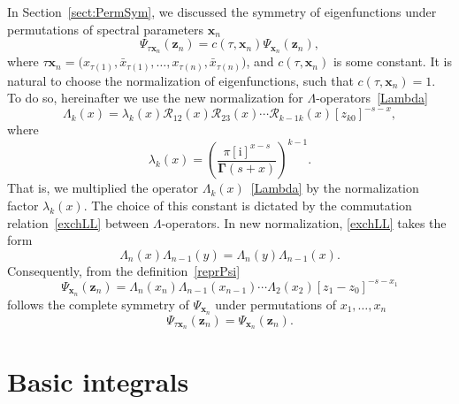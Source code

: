 \documentclass[pdftex]{sigma}
\renewcommand{\imath}{\mathrm{i}}
\numberwithin{equation}{section}
\begin{document}
In Section~\ref{sect:PermSym}, we discussed the symmetry of eigenfunctions under permutations of spectral parameters $\bm x_n$
\begin{equation*}
	\Psi_{\tau \bm x_n}(\bm z_n) =
	c(\tau,\bm x_n) \Psi_{\bm x_n}(\bm z_n) ,
\end{equation*}
where $\tau \bm x_n = \bigl(x_{\tau(1)},\bar{x}_{\tau(1)}, \dots , x_{\tau(n)},\bar{x}_{\tau(n)}\bigr)$, and $c(\tau,\bm x_n)$ is some constant. It is natural to choose the normalization of eigenfunctions, such that $c(\tau,\bm x_n)=1$.
To do so, hereinafter we use the new normalization for $\Lambda$-operators~\eqref{Lambda}
\begin{equation*}
	\Lambda_k(x) = \lambda_k(x) \mathcal{R}_{12}(x)\mathcal{R}_{23}(x)\cdots
	\mathcal{R}_{k-1 k}(x) [z_{k0}]^{-s-x} ,
\end{equation*}
where
\begin{equation} \label{lambda}
	\lambda_k(x) =
	\left(\frac{\pi [\imath]^{x-s}}{\mathbf{\Gamma}(s+x)}\right)^{k-1} .
\end{equation}
That is, we multiplied the operator $\Lambda_k(x)$~\eqref{Lambda} by the normalization factor $\lambda_k(x)$. The choice of this constant is dictated by the commutation relation~\eqref{exchLL} between $\Lambda$-operators. In new normalization, \eqref{exchLL} takes the form
\begin{equation*}
	\Lambda_n(x) \Lambda_{n-1}(y) =
	\Lambda_n(y) \Lambda_{n-1}(x) .
\end{equation*}
Consequently, from the definition~\eqref{reprPsi}
\begin{equation*}
	\Psi_{\bm{x}_n}(\bm z_n) =
	\Lambda_n( x_n)
	\Lambda_{n-1}( x_{n-1})\cdots
	\Lambda_{2}( x_{2}) [z_1-z_0]^{-s-x_1}
\end{equation*}
follows the complete symmetry of $\Psi_{\bm{x}_n}$ under permutations of $x_1, \dots, x_n$
\begin{equation*}
	\Psi_{\tau \bm x_n}(\bm z_n) =
	\Psi_{\bm x_n}(\bm z_n) .
\end{equation*}

\section{Basic integrals}
\label{sect:Basic}
\end{document}
